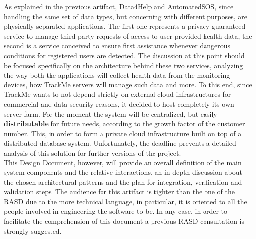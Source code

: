 


{}
As explained in the previous artifact, Data4Help and AutomatedSOS, since handling the same set of data types, but concerning with different purposes, are physically separated applications. The first one represents a privacy-guaranteed service to manage third party requests of access to user-provided health data, the second is a service conceived to ensure first assistance whenever dangerous conditions for registered users are detected. The discussion at this point should be focused specifically on the architecture behind these two services, analyzing the way both the applications will collect health data from the monitoring devices, how TrackMe servers will manage such data and more. To this end, since TrackMe wants to not depend strictly on external cloud infrastructures for commercial and data-security reasons, it decided to host completely its own server farm. For the moment the system will be centralized, but easily \textbf{distributable} for future needs, according to the growth factor of the customer number. This, in order to form a private cloud infrastructure built on top of a distributed database system. Unfortunately, the deadline prevents a detailed analysis of this solution for further versions of the project.\\
This Design Document, however, will provide an overall definition of the main system components and the relative interactions, an in-depth discussion about the chosen architectural patterns and the plan for integration, verification and validation steps. The audience for this artifact is tighter than the one of the RASD due to the more technical language, in particular, it is oriented to all the people involved in engineering the software-to-be. In any case, in order to facilitate the comprehension of this document a previous RASD consultation is strongly suggested.

{}





